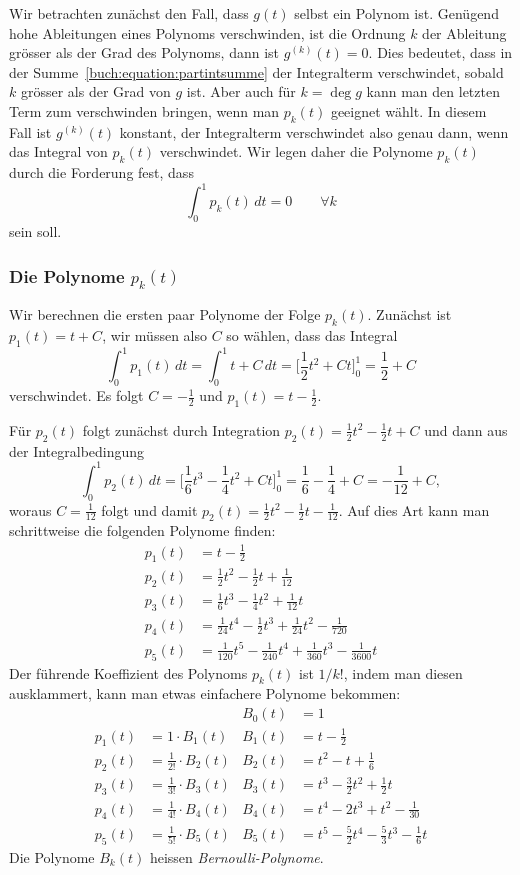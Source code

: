 Wir betrachten zunächst den Fall, dass $g(t)$ selbst ein Polynom ist.
Genügend hohe Ableitungen eines Polynoms verschwinden, ist die Ordnung $k$
der Ableitung grösser als der Grad des Polynoms, dann ist $g^{(k)}(t)=0$.
Dies bedeutet, dass in der Summe~\eqref{buch:equation:partintsumme}
der Integralterm verschwindet, sobald $k$ grösser als der Grad von $g$ ist.
Aber auch für $k=\deg g$ kann man den letzten Term zum verschwinden
bringen, wenn man $p_k(t)$ geeignet wählt.
In diesem Fall ist $g^{(k)}(t)$ konstant, der Integralterm verschwindet
also genau dann, wenn das Integral von $p_k(t)$ verschwindet.
Wir legen daher die Polynome $p_k(t)$ durch die Forderung fest, dass
\begin{equation}
\int_0^1 p_k(t)\,dt = 0\qquad\forall k
\end{equation}
sein soll.

\subsubsection{Die Polynome $p_k(t)$}
Wir berechnen die ersten paar Polynome der Folge $p_k(t)$.
Zunächst ist $p_1(t) = t+C$, wir müssen also $C$ so wählen, dass
das Integral
\[
\int_0^1 p_1(t)\,dt
=
\int_0^1 t+C\,dt
=
\biggl[\frac12t^2 + Ct\biggr]_0^1
=
\frac12 + C
\]
verschwindet.
Es folgt $C=-\frac12$ und $p_1(t)=t-\frac12$.

Für $p_2(t)$ folgt zunächst durch Integration $p_2(t)=\frac12t^2-\frac12t+C$
und dann aus der Integralbedingung
\[
\int_0^1 p_2(t) \,dt
=
\biggl[
\frac16t^3-\frac14t^2+Ct
\biggr]_0^1
=
\frac16-\frac14+C
=
-\frac1{12}+C,
\]
woraus $C=\frac1{12}$ folgt und damit
$p_2(t) = \frac12t^2 -\frac12t-\frac1{12}$.
Auf dies Art kann man schrittweise die folgenden Polynome finden:
\begin{align*}
p_1(t)
&=
t-\frac12
\\
p_2(t)
&=
\frac12t^2 - \frac12t +\frac1{12}
\\
p_3(t)
&= 
\frac16t^3 - \frac14t^2 +\frac1{12}t
\\
p_4(t)
&=
\frac1{24}t^4-\frac12t^3 + \frac1{24} t^2 - \frac1{720}
\\
p_5(t)
&=
\frac1{120}t^5 - \frac{1}{240} t^4+\frac1{360} t^3 -\frac1{3600}t
\end{align*}
Der führende Koeffizient des Polynoms $p_k(t)$ ist $1/k!$, indem man
diesen ausklammert, kann man etwas einfachere Polynome bekommen:
\begin{align*}
       &                         & B_0(t) &= 1                                \\
p_1(t) &= 1         \cdot B_1(t) & B_1(t) &= t -\frac12                       \\
p_2(t) &= \frac1{2!}\cdot B_2(t) & B_2(t) &= t^2 - t + \frac16                \\
p_3(t) &= \frac1{3!}\cdot B_3(t) & B_3(t) &= t^3-\frac32 t^2+\frac12t         \\
p_4(t) &= \frac1{4!}\cdot B_4(t) & B_4(t) &= t^4-2t^3+t^2-\frac1{30}          \\
p_5(t) &= \frac1{5!}\cdot B_5(t) & B_5(t) &= t^5-\frac52t^4-\frac53t^3-\frac16t
\end{align*}
Die Polynome $B_k(t)$ heissen {\em Bernoulli-Polynome}.


